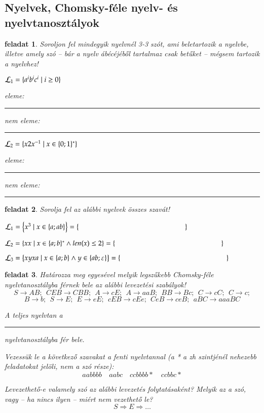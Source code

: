 \documentclass[a4paper]{article}
\newtheorem{feladat}{feladat}[section]
\newcommand{\spacer}[1][2 cm]{\rule{#1}{.4pt}\rule{0pt}{2em} }
\begin{document}
\newpage
\subsection{Nyelvek, Chomsky-féle nyelv- és nyelvtanosztályok}
\begin{feladat}
Soroljon fel mindegyik nyelvnél 3-3 szót, ami beletartozik a nyelvbe,
illetve amely szó -- bár a nyelv ábécéjéből tartalmaz csak betűket --
mégsem tartozik a nyelvhez!

${\cal L}_1 = \{a^ib^ic^i  \mid i\ge 0\}$

eleme: \spacer

nem eleme: \spacer

${\cal L}_2 = \{x2x^{-1} \mid x\in \{0; 1\}^*\}$

eleme: \spacer

nem eleme: \spacer
\end{feladat}

\begin{feladat}
Sorolja fel az alábbi nyelvek összes szavát!

${\cal L}_1 = \left\{x^3 \mid x\in \{a; ab\}\right\} = \{ \hspace{15em}  \}$

${\cal L}_2 = \left\{xx \mid x\in \{a; b\}^* \wedge  len(x) \le 2\right\} = \{
\hspace{15em}  \}$

${\cal L}_3 = \left\{xyxa \mid x\in \{a; b\} \wedge y\in \{ab;
\varepsilon\}\right\} = \{
\hspace{15em}  \}$
\end{feladat}

\begin{feladat}
Határozza meg egyesével melyik legszűkebb Chomsky-féle nyelvtanosztályba
férnek bele az alábbi levezetési szabályok!
\[ S\rightarrow AB;\:\: CEB\rightarrow CBB;\:\:
A\rightarrow cE;\:\: A\rightarrow aaB;\:\:BB\rightarrow Bc;\:\: 
C\rightarrow cC;\:\: C\rightarrow c;\]
\[B\rightarrow b;\:\: S\rightarrow E;\:\: E\rightarrow eE;\:\:  cEB\rightarrow cEe;\:\:  CeB\rightarrow ceB;\:\:
aBC\rightarrow aaaBC\]

\vspace{3ex}
A teljes nyelvtan a \spacer[8em] nyelvtanosztályba fér bele.

Vezessük le a következő szavakat a fenti nyelvtannal (a * a zh
szintjénél nehezebb feladatokat jelöli, nem a szó része):
\[aabbbb \quad aabc\quad ccbbbb* \quad ccbbc*\]

\vspace{6em}

Levezethető-e valamely szó az alábbi levezetés folytatásaként? Melyik az
a szó, vagy -- ha nincs ilyen -- miért nem vezethető le?
\[S\Rightarrow E \Rightarrow \ldots\]
\end{feladat}
\end{document}
